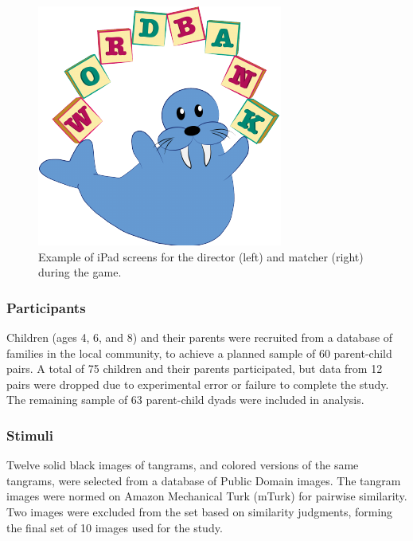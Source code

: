 \documentclass[10pt, letterpaper]{article}
\newenvironment{CodeChunk}{}{}
\begin{document}
\begin{CodeChunk}
\begin{figure}[h]

{\centering \includegraphics{figs/2-col-image-1} 

}

\caption[Example of iPad screens for the director (left) and matcher (right) during the game]{Example of iPad screens for the director (left) and matcher (right) during the game.}\label{fig:2-col-image}
\end{figure}
\end{CodeChunk}

\hypertarget{participants}{%
\subsubsection{Participants}\label{participants}}

Children (ages 4, 6, and 8) and their parents were recruited from a
database of families in the local community, to achieve a planned sample
of 60 parent-child pairs. A total of 75 children and their parents
participated, but data from 12 pairs were dropped due to experimental
error or failure to complete the study. The remaining sample of 63
parent-child dyads were included in analysis.

\hypertarget{stimuli}{%
\subsubsection{Stimuli}\label{stimuli}}

Twelve solid black images of tangrams, and colored versions of the same
tangrams, were selected from a database of Public Domain images. The
tangram images were normed on Amazon Mechanical Turk (mTurk) for
pairwise similarity. Two images were excluded from the set based on
similarity judgments, forming the final set of 10 images used for the
study.
\end{document}
